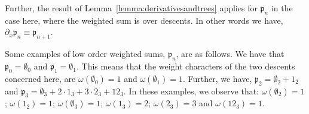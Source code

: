 \documentclass[5p,twocolumn]{elsarticle}
\newcommand*{\pa}{{\partial}}
\newcommand*{\pf}{\mathfrak p}
\begin{document}
%
Further, the result of Lemma~\ref{lemma:derivativesandtrees} applies for $\pf_n$ in the case here, where the weighted sum is over descents. In other words we have, $\pa_x\pf_n\equiv\pf_{n+1}$.
%
\begin{example}\label{ex:weightedsums}
Some examples of low order weighted sums, $\pf_n$, are as follows. 
We have that $\pf_0=\emptyset_0$ and $\pf_1=\emptyset_1$.
This means that the weight characters of the two descents concerned here, are $\omega(\emptyset_0)=1$ and $\omega(\emptyset_1)=1$.
Further, we have, $\pf_2=\emptyset_2+1_2$ and $\pf_3=\emptyset_3+2\cdot 1_3+3\cdot 2_3+12_3$.
In these examples, we observe that: $\omega(\emptyset_2)=1$; $\omega(1_2)=1$; $\omega(\emptyset_3)=1$; $\omega(1_3)=2$; $\omega(2_3)=3$ and $\omega(12_3)=1$.
\end{example}
%
\end{document}
